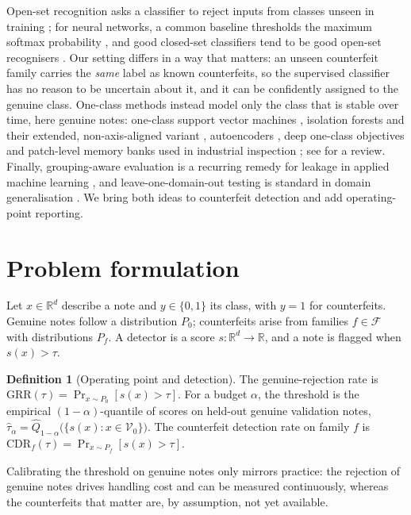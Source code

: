 \documentclass{article}
\theoremstyle{definition}
\newtheorem{definition}{Definition}
\theoremstyle{remark}
\newcommand{\CDR}{\mathrm{CDR}}
\newcommand{\GRR}{\mathrm{GRR}}
\begin{document}
Open-set recognition asks a classifier to reject inputs from classes unseen in training \citep{scheirer2013toward}; for neural networks, a common baseline thresholds the maximum softmax probability \citep{hendrycks2017baseline}, and good closed-set classifiers tend to be good open-set recognisers \citep{vaze2022openset}. Our setting differs in a way that matters: an unseen counterfeit family carries the \emph{same} label as known counterfeits, so the supervised classifier has no reason to be uncertain about it, and it can be confidently assigned to the genuine class. One-class methods instead model only the class that is stable over time, here genuine notes: one-class support vector machines \citep{scholkopf2001estimating}, isolation forests \citep{liu2008isolation} and their extended, non-axis-aligned variant \citep{hariri2021extended}, autoencoders \citep{hinton2006reducing}, deep one-class objectives \citep{ruff2018deep} and patch-level memory banks used in industrial inspection \citep{roth2022towards}; see \citet{pang2021deep} for a review. Finally, grouping-aware evaluation is a recurring remedy for leakage in applied machine learning \citep{kapoor2023leakage}, and leave-one-domain-out testing is standard in domain generalisation \citep{gulrajani2021search}. We bring both ideas to counterfeit detection and add operating-point reporting.

\section{Problem formulation}
\label{sec:problem}

Let $x\in\mathbb{R}^d$ describe a note and $y\in\{0,1\}$ its class, with $y=1$ for counterfeits. Genuine notes follow a distribution $P_0$; counterfeits arise from families $f\in\mathcal{F}$ with distributions $P_f$. A detector is a score $s:\mathbb{R}^d\to\mathbb{R}$, and a note is flagged when $s(x)>\tau$.

\begin{definition}[Operating point and detection]
The genuine-rejection rate is $\GRR(\tau)=\Pr_{x\sim P_0}[s(x)>\tau]$. For a budget $\alpha$, the threshold is the empirical $(1-\alpha)$-quantile of scores on held-out genuine validation notes, $\hat\tau_\alpha=\hat Q_{1-\alpha}\big(\{s(x):x\in\mathcal{V}_0\}\big)$. The counterfeit detection rate on family $f$ is $\CDR_f(\tau)=\Pr_{x\sim P_f}[s(x)>\tau]$.
\end{definition}

Calibrating the threshold on genuine notes only mirrors practice: the rejection of genuine notes drives handling cost and can be measured continuously, whereas the counterfeits that matter are, by assumption, not yet available.
\end{document}
